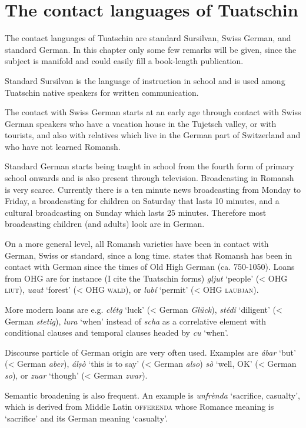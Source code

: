 \chapter{The contact languages of Tuatschin}
The contact languages of Tuatschin are standard Sursilvan, Swiss German, and standard German. In this chapter only some few remarks will be given, since the subject is manifold and could easily fill a book-length publication. 

Standard Sursilvan is the language of instruction in school and is used among Tuatschin native speakers for written communication.

The contact with Swiss German starts at an early age through contact with Swiss German speakers who have a vacation house in the Tujetsch valley, or with tourists, and also with relatives which live in the German part of Switzerland and who have not learned Romansh.

Standard German starts being taught in school from the fourth form of primary school onwards and is also present through television. Broadcasting in Romansh is very scarce. Currently there is a ten minute news broadcasting from Monday to Friday, a broadcasting for children on Saturday that lasts 10 minutes, and a cultural broadcasting on Sunday which lasts 25 minutes. Therefore most broadcasting children (and adults) look are in German.

On a more general level, all Romansh varieties have been in contact with German, Swiss or standard, since a long time. \citet[176--181]{Liver2010} states that Romansh has been in contact with German since the times of Old High German (ca. 750-1050). Loans from OHG are for instance (I cite the Tuatschin forms) \textit{gljut} `people' (< OHG \textsc{liut}), \textit{uaut} `forest' (< OHG \textsc{wald}), or \textit{lubí} `permit' (< OHG \textsc{laubjan}).

More modern loans are e.g. \textit{clétg} `luck' (< German \textit{Glück}), \textit{stédi} `diligent' (< German \textit{stetig}), \textit{lura} `when' instead of \textit{scha} as a correlative element with conditional clauses and temporal clauses headed by \textit{cu} `when'.

Discourse particle of German origin are very often used. Examples are \textit{ábar} `but' (< German \textit{aber}), \textit{álṣò} `this is to say' (< German \textit{also}) \textit{sò} `well, OK' (< German \textit{so}), or \textit{zuar} `though' (< German \textit{zwar}).

Semantic broadening is also frequent. An example is \textit{unfrènda} `sacrifice, casualty', which is derived from Middle Latin \textsc{offerenda} \citet[1283]{Decurtins2012} whose Romance meaning is `sacrifice' and its German meaning `casualty'.


